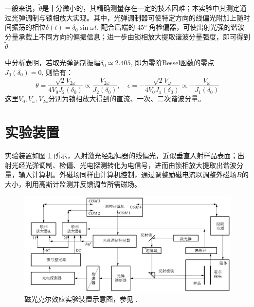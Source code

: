 \documentclass[aps,pre,12pt,preprint,%
	onecolumn,showpacs,showkeys,nofootinbib]{revtex4-1}
\begin{document}
	一般来说，$\tilde{\theta}$是十分微小的，其精确测量存在一定的技术困难；本实验中其测定通过光弹调制与锁相放大实现。其中，光弹调制器可使特定方向的线偏光附加上随时间振荡的相位$\delta(t) = \delta_0\sin\omega t$, 配合后端的 \ang{45} 角检偏器，可使出射光强的谐波分量承载上不同方向的偏振信息；进一步由锁相放大提取谐波分量强度，即可得到$\tilde{\theta}$. 
	
	\cite{textbook} 中分析表明，若取光弹调制振幅$\delta_0\simeq 2.405$, 即为零阶Bessel函数的零点$J_0(\delta_0) = 0$, 则恰有：
	\begin{equation}
		\theta = \frac{\sqrt{2}V_{2\omega}}{4V_0 J_2(\delta_0)}
		\propto \frac{V_{2\omega}}{J_2(\delta_0)},\quad
		\epsilon = - \frac{\sqrt{2}V_{\omega}}{4V_0 J_1(\delta_0)}
		\propto - \frac{V_{\omega}}{J_1(\delta_0)}
	\label{eq:signalHarmonics}
	\end{equation}
	这里$V_0,V_\omega,V_{2\omega}$分别为锁相放大得到的直流、一次、二次谐波分量。
\clearpage
\section{实验装置}
	实验装置如图 \ref{fig:apparatus} 所示，入射激光经起偏器的线偏光，近似垂直入射样品表面；出射光经光弹调制、检偏、光电探测转化为电信号，进而由锁相放大提取出谐波分量，输入计算机。外磁场同样由计算机控制，通过调整励磁电流以调整外磁场$B$的大小，利用高斯计监测并反馈调节所需磁场。
	
	\begin{figure}[!ht]
		\centering
		\includegraphics[width=.85\linewidth]{img/apparatus.png}
		\par\vspace{.5\baselineskip}
		\caption[磁光克尔效应实验装置]{%
			磁光克尔效应实验装置示意图，参见 \cite{textbook}. %
		}
		\label{fig:apparatus}
	\end{figure}
	
\end{document}
